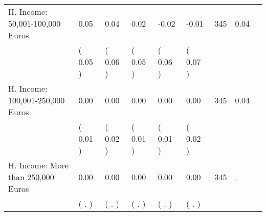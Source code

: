 \begin{tabular}{L{6.2cm} C{1.8cm} C{1.8cm} C{1.8cm} C{1.8cm} C{1.8cm} C{1.8cm} C{0.3cm} C{0.3cm}}
H. Income: 50,001-100,000 Euros &      0.05 &      0.04 &      0.02 &     -0.02 &     -0.01  & 345 &       0.04 \\ 
 & (     0.05 ) & (     0.06 ) & (     0.05 ) & (     0.06 ) & (     0.07 )  & \\
H. Income: 100,001-250,000 Euros &      0.00 &      0.00 &      0.00 &      0.00 &      0.00  & 345 &       0.04 \\ 
 & (     0.01 ) & (     0.02 ) & (     0.01 ) & (     0.01 ) & (     0.02 )  & \\
H. Income: More than 250,000 Euros &      0.00 &      0.00 &      0.00 &      0.00 &      0.00  & 345 &          . \\ 
 & (        . ) & (        . ) & (        . ) & (        . ) & (        . )  & \\
\bottomrule
\end{tabular}

